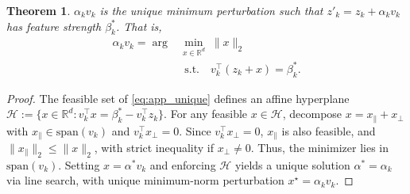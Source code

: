 \documentclass{article}
\theoremstyle{plain}
\newtheorem{theorem}{Theorem}[section]
\theoremstyle{definition}
\theoremstyle{remark}
\begin{document}
\begin{theorem}\label{ap:min_pert}
    $\alpha_k v_k$ is the unique minimum perturbation such that $z'_k = z_k + \alpha_k v_k$ has feature strength $\beta^*_k$. That is, 
    \begin{equation}\label{eq:app_unique}
        \begin{aligned}
        \alpha_k v_k = \arg&\min_{x \in \mathbb{R}^d} \; \|x\|_2 \\
        &\ \ \textrm{s.t.}  \quad v_k^{\top}(z_k + x) = \beta_k^* .
        \end{aligned}
    \end{equation}
\end{theorem}
\begin{proof}
The feasible set of \eqref{eq:app_unique} defines an affine hyperplane
$\mathcal{H} := \{x \in \mathbb{R}^d : v_k^\top x = \beta_k^* - v_k^\top z_k\}$.
For any feasible $x \in \mathcal{H}$, decompose $x = x_\parallel + x_\perp$ with
$x_\parallel \in \mathrm{span}(v_k)$ and $v_k^\top x_\perp = 0$. Since $v_k^\top x_\perp =0 $, $x_\parallel$ is also feasible, and
$\|x_\parallel\|_2 \le \|x\|_2$, with strict inequality if $x_\perp \neq 0$.
Thus, the minimizer lies in $\mathrm{span}(v_k)$.
Setting $x = \alpha^* v_k$ and enforcing $\mathcal{H}$ yields a unique solution
$\alpha^* = \alpha_k$ via line search, with unique minimum-norm perturbation
$x^\star = \alpha_k v_k$.
\end{proof}
\end{document}
